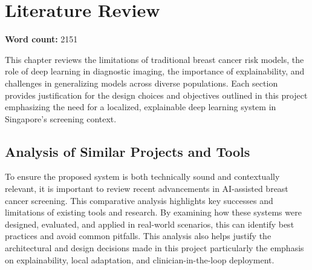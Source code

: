 \documentclass[12pt]{article}
\begin{document}
\newpage
\section{Literature Review}
\label{chapter2}
\noindent\textbf{Word count:} 2151
\vspace{2em}

This chapter reviews the limitations of traditional breast cancer risk models, the role of deep learning in diagnostic imaging, the importance of explainability, and challenges in generalizing models across diverse populations. Each section provides justification for the design choices and objectives outlined in this project emphasizing the need for a localized, explainable deep learning system in Singapore's screening context.

\subsection{Analysis of Similar Projects and Tools}

To ensure the proposed system is both technically sound and contextually relevant, it is important to review recent advancements in AI-assisted breast cancer screening. This comparative analysis highlights key successes and limitations of existing tools and research. By examining how these systems were designed, evaluated, and applied in real-world scenarios, this can identify best practices and avoid common pitfalls. This analysis also helps justify the architectural and design decisions made in this project particularly the emphasis on explainability, local adaptation, and clinician-in-the-loop deployment.
\end{document}
